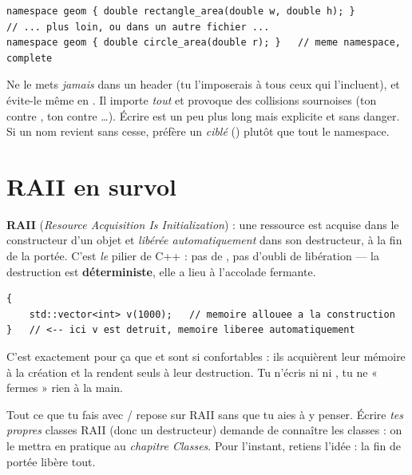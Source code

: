 \documentclass[11pt]{article}
\begin{document}
\begin{lstlisting}
namespace geom { double rectangle_area(double w, double h); }
// ... plus loin, ou dans un autre fichier ...
namespace geom { double circle_area(double r); }   // meme namespace, complete
\end{lstlisting}

\begin{piege}
Ne le mets \emph{jamais} dans un header (tu l'imposerais à tous ceux qui
l'incluent), et évite-le même en . Il importe \emph{tout}
 et provoque des collisions sournoises (ton  contre
, ton  contre \ldots).
Écrire  est un peu plus long mais explicite et sans danger. Si
un nom revient sans cesse, préfère un  \emph{ciblé}
() plutôt que tout le namespace.
\end{piege}

\section{RAII en survol}

\textbf{RAII} (\emph{Resource Acquisition Is Initialization}) : une ressource
est acquise dans le constructeur d'un objet et \emph{libérée automatiquement}
dans son destructeur, à la fin de la portée. C'est \emph{le} pilier de C++ : pas
de , pas d'oubli de libération — la destruction est
\textbf{déterministe}, elle a lieu à l'accolade fermante.

\begin{lstlisting}
{
    std::vector<int> v(1000);   // memoire allouee a la construction
}   // <-- ici v est detruit, memoire liberee automatiquement
\end{lstlisting}

C'est exactement pour ça que  et  sont si
confortables : ils acquièrent leur mémoire à la création et la rendent seuls à
leur destruction. Tu n'écris ni  ni , tu ne « fermes »
rien à la main.

\begin{aretenir}
Tout ce que tu fais avec / repose sur RAII sans que tu
aies à y penser. Écrire \emph{tes propres} classes RAII (donc un destructeur)
demande de connaître les classes : on le mettra en pratique au \emph{chapitre
Classes}. Pour l'instant, retiens l'idée : la fin de portée libère tout.
\end{aretenir}
\end{document}
